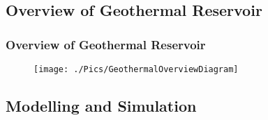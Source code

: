 \documentclass[10pt,compress,unknownkeysallowed]{beamer}
\begin{document}
\subsection{Overview of Geothermal Reservoir}

\begin{frame}
 \frametitle{Overview of Geothermal Reservoir}
   \begin{figure}%
     \texttt{[image: ./Pics/GeothermalOverviewDiagram]}
   \end{figure}  
\end{frame}


\subsection{Modelling and Simulation}
\end{document}
